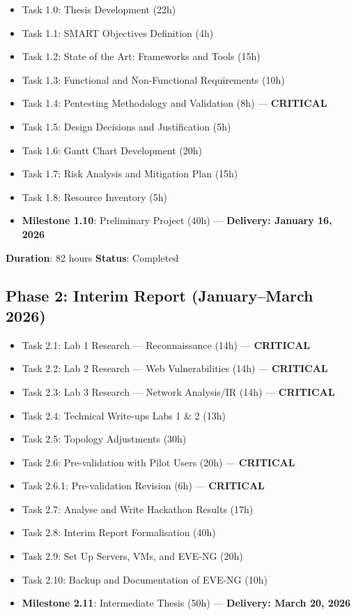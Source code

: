 \begin{itemize}
\item Task 1.0: Thesis Development (22h)
\item Task 1.1: SMART Objectives Definition (4h)
\item Task 1.2: State of the Art: Frameworks and Tools (15h)
\item Task 1.3: Functional and Non-Functional Requirements (10h)
\item Task 1.4: Pentesting Methodology and Validation (8h) --- \textbf{CRITICAL}
\item Task 1.5: Design Decisions and Justification (5h)
\item Task 1.6: Gantt Chart Development (20h)
\item Task 1.7: Risk Analysis and Mitigation Plan (15h)
\item Task 1.8: Resource Inventory (5h)
\item \textbf{Milestone 1.10}: Preliminary Project (40h) --- \textbf{Delivery: January 16, 2026}
\end{itemize}

\textbf{Duration}: 82 hours \quad \textbf{Status}: Completed

\subsection{Phase 2: Interim Report (January--March 2026)}

\begin{itemize}
\item Task 2.1: Lab 1 Research --- Reconnaissance (14h) --- \textbf{CRITICAL}
\item Task 2.2: Lab 2 Research --- Web Vulnerabilities (14h) --- \textbf{CRITICAL}
\item Task 2.3: Lab 3 Research --- Network Analysis/IR (14h) --- \textbf{CRITICAL}
\item Task 2.4: Technical Write-ups Labs 1 \& 2 (13h)
\item Task 2.5: Topology Adjustments (30h)
\item Task 2.6: Pre-validation with Pilot Users (20h) --- \textbf{CRITICAL}
\item Task 2.6.1: Pre-validation Revision (6h) --- \textbf{CRITICAL}
\item Task 2.7: Analyse and Write Hackathon Results (17h)
\item Task 2.8: Interim Report Formalisation (40h)
\item Task 2.9: Set Up Servers, VMs, and EVE-NG (20h)
\item Task 2.10: Backup and Documentation of EVE-NG (10h)
\item \textbf{Milestone 2.11}: Intermediate Thesis (50h) --- \textbf{Delivery: March 20, 2026}
\end{itemize}

